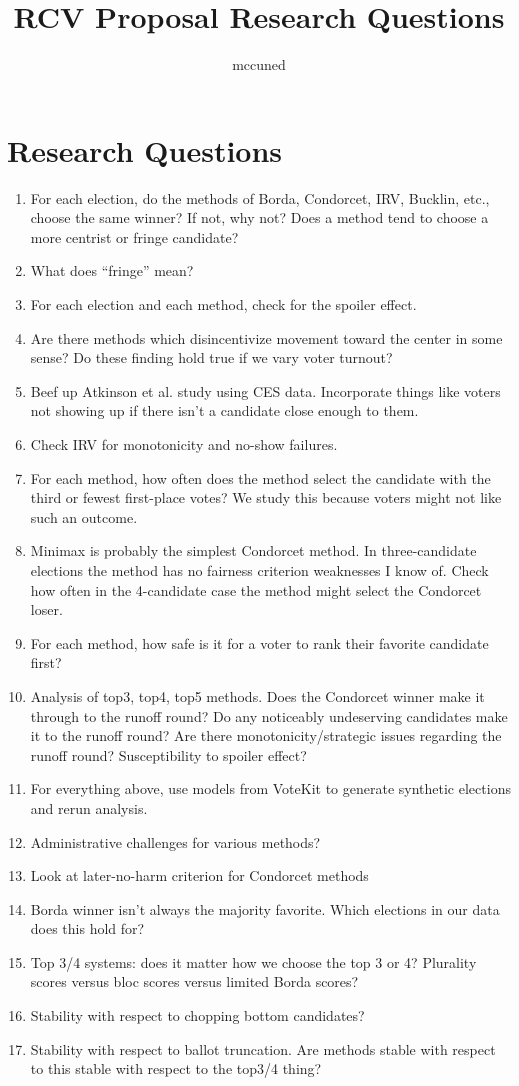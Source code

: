 \documentclass{article}
\title{RCV Proposal Research Questions}
\author{mccuned }
\date{}
\begin{document}
\maketitle

\section{Research Questions}

\begin{enumerate}
\item For each election, do the methods of Borda, Condorcet, IRV, Bucklin, etc., choose the same winner? If not, why not? Does a method tend to choose a more centrist or fringe candidate?
\item What does ``fringe'' mean?
\item For each election and each method, check for the spoiler effect.
\item Are there methods which disincentivize movement toward the center in some sense? Do these finding hold true if we vary voter turnout?
\item Beef up Atkinson et al. study using CES data. Incorporate things like voters not showing up if there isn't a candidate close enough to them.
\item Check IRV for monotonicity and no-show failures.
\item For each method, how often does the method select the candidate with the third or fewest first-place votes? We study this because voters might not like such an outcome.
\item Minimax is probably the simplest Condorcet method. In three-candidate elections the method has no fairness criterion weaknesses I know of. Check how often in the 4-candidate case the method might select the Condorcet loser.
\item For each method, how safe is it for a voter to rank their favorite candidate first?
\item Analysis of top3, top4, top5 methods. Does the Condorcet winner make it through to the runoff round? Do any noticeably undeserving candidates make it to the runoff round? Are there monotonicity/strategic issues regarding the runoff round? Susceptibility to spoiler effect?
\item For everything above, use models from VoteKit to generate synthetic elections and rerun analysis.
\item Administrative challenges for various methods?

\item Look at later-no-harm criterion for Condorcet methods
\item Borda winner isn't always the majority favorite. Which elections in our data does this hold for?

\item Top 3/4 systems: does it matter how we choose the top 3 or 4? Plurality scores versus bloc scores versus limited Borda scores?
\item Stability with respect to chopping bottom candidates?
\item Stability with respect to ballot truncation. Are methods stable with respect to this stable with respect to the top3/4 thing?
\end{enumerate}
\end{document}

